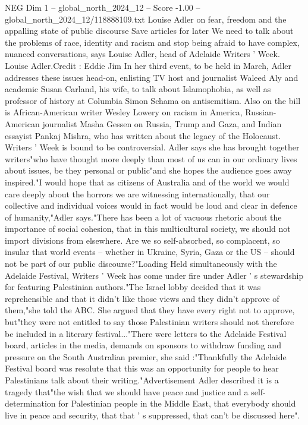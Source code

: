 \begin{textsample}{NEG Dim 1 – global\_north\_2024\_12 – Score -1.00 – global\_north\_2024\_12/118888109.txt}  \label{ex:f1_neg_189}
Louise Adler on fear, freedom and the appalling state of public discourse Save articles for later We need to talk about the problems of race, identity and racism and stop being afraid to have complex, nuanced conversations, says Louise Adler, head of Adelaide Writers ' Week.
Louise Adler.Credit : Eddie Jim In her third event, to be held in March, Adler addresses these issues head-on, enlisting TV host and journalist Waleed Aly and academic Susan Carland, his wife, to talk about Islamophobia, as well as professor of history at Columbia Simon Schama on antisemitism.
Also on the bill is African-American writer Wesley Lowery on racism in America, Russian-American journalist Masha Gessen on Russia, Trump and Gaza, and Indian essayist Pankaj Mishra, who has written about the legacy of the Holocaust.
Writers ' Week is bound to be controversial.
Adler says she has brought together writers"who have thought more deeply than most of us can in our ordinary lives about issues, be they personal or public"and she hopes the audience goes away inspired."I would hope that as citizens of Australia and of the world we would care deeply about the horrors we are witnessing internationally, that our collective and individual voices would in fact would be loud and clear in defence of humanity,"Adler says."There has been a lot of vacuous rhetoric about the importance of social cohesion, that in this multicultural society, we should not import divisions from elsewhere.
Are we so self-absorbed, so complacent, so insular that world events -- whether in Ukraine, Syria, Gaza or the US -- should not be part of our public discourse?"Loading Held simultaneously with the Adelaide Festival, Writers ' Week has come under fire under Adler ' s stewardship for featuring Palestinian authors."The Israel lobby decided that it was reprehensible and that it didn't like those views and they didn't approve of them,"she told the ABC.
She argued that they have every right not to approve, but"they were not entitled to say those Palestinian writers should not therefore be included in a literary festival..."There were letters to the Adelaide Festival board, articles in the media, demands on sponsors to withdraw funding and pressure on the South Australian premier, she said :"Thankfully the Adelaide Festival board was resolute that this was an opportunity for people to hear Palestinians talk about their writing."Advertisement Adler described it is a tragedy that"the wish that we should have peace and justice and a self-determination for Palestinian people in the Middle East, that everybody should live in peace and security, that that ' s suppressed, that can't be discussed here".

\end{textsample}
